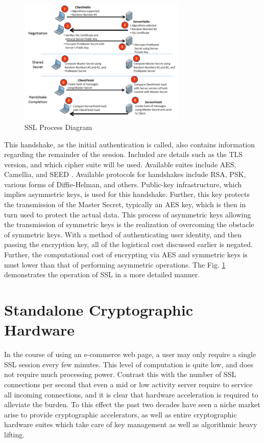 \documentclass[journal]{IEEEtran}
\begin{document}
\begin{figure}[htbp]
	\centering
	\includegraphics[width=8cm,keepaspectratio]{img/sslDiagram.png}
	\caption{SSL Process Diagram \cite{sslImage} }
	\label{sslFigure}
\end{figure}


This handshake, as the initial authentication is called, also contains information regarding the remainder of the session.  Included are details such as the TLS version, and which cipher suite will be used.  Available suites include AES, Camellia, and SEED \cite{tlsRFC}.  Available protocols for handshakes include RSA, PSK, various forms of Diffie-Helman, and others. Public-key infrastructure, which implies asymmetric keys, is used for this handshake.  Further, this key protects the transmission of the Master Secret, typically an AES key, which is then in turn used to protect the actual data.  This process of asymmetric keys allowing the transmission of symmetric keys is the realization of overcoming the obstacle of symmetric keys.  With a method of authenticating user identity, and then passing the encryption key, all of the logistical cost discussed earlier is negated.  Further, the computational cost of encrypting via AES and symmetric keys is must lower than that of performing asymmetric operations.  The Fig. \ref{sslFigure} demonstrates the operation of SSL in a more detailed manner.

\section{Standalone Cryptographic Hardware}

In the course of using an e-commerce web page, a user may only require a single SSL session every few minutes.  This level of computation is quite low, and does not require much processing power.  Contrast this with the number of SSL connections per second that even a mid or low activity server require to service all incoming connections, and it is clear that hardware acceleration is required to alleviate the burden.  To this effect the past two decades have seen a niche market arise to provide cryptographic accelerators, as well as entire cryptographic hardware suites which take care of key management as well as algorithmic heavy lifting.
\end{document}
